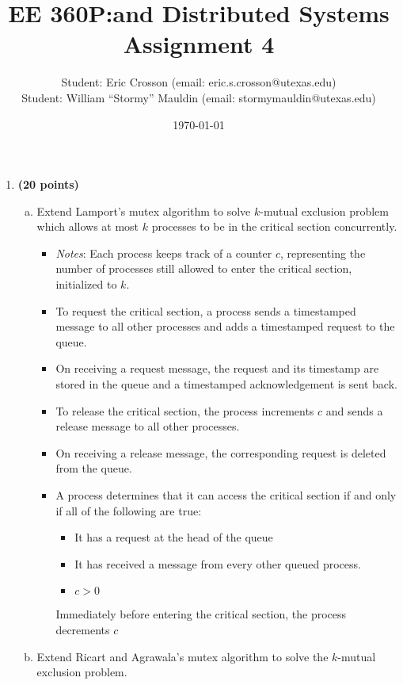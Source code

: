 \documentclass[11pt]{article}
\newcounter{problem}
\begin{document}
\title{EE 360P:\@Concurrent and Distributed Systems \\ Assignment 4}
\author{Student: Eric Crosson (email: eric.s.crosson@utexas.edu)\\
  Student: William ``Stormy'' Mauldin (email: stormymauldin@utexas.edu)}
\date{\today}
\maketitle

\begin{enumerate}
\item \textbf{(20 points)} 
\begin{enumerate}[(a)]
\item Extend Lamport's mutex algorithm to solve $k$-mutual exclusion problem which allows at most $k$ processes to be in the critical section concurrently.

\begin{itemize}
\item \emph{Notes}: Each process keeps track of a counter $c$, representing the number of processes still allowed to enter the critical section, initialized to $k$.
\item To request the critical section, a process sends a timestamped message to all other processes and adds a timestamped request to the queue.
\item On receiving a request message, the request and its timestamp are stored in the queue and a timestamped acknowledgement is sent back.
\item To release the critical section, the process increments $c$ and sends a release message to all other processes.
\item On receiving a release message, the corresponding request is deleted from the queue.
\item A process determines that it can access the critical section if and only if all of the following are true: 
\begin{itemize}
\item It has a request at the head of the queue
\item It has received a message from every other queued process.
\item $c > 0$
\end{itemize}
Immediately before entering the critical section, the process decrements $c$
\end{itemize}


\item Extend Ricart and Agrawala's mutex algorithm to solve the $k$-mutual exclusion problem.   


\end{enumerate}
\end{enumerate}
\end{document}
